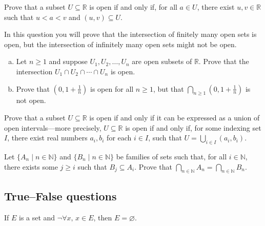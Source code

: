 \begin{chapex}
Prove that a subset $U \subseteq \mathbb{R}$ is open if and only if, for all $a \in U$, there exist $u,v \in \mathbb{R}$ such that $u<a<v$ and $(u,v) \subseteq U$.
\end{chapex}

\begin{chapex}
In this question you will prove that the intersection of finitely many open sets is open, but the intersection of infinitely many open sets might not be open.
\begin{enumerate}[(a)]
\item Let $n \ge 1$ and suppose $U_1, U_2, \dots, U_n$ are open subsets of $\mathbb{R}$. Prove that the intersection $U_1 \cap U_2 \cap \cdots \cap U_n$ is open.
\item Prove that $(0,1+\frac{1}{n})$ is open for all $n \ge 1$, but that $\bigcap_{n \ge 1} (0,1+\textstyle\frac{1}{n})$ is not open.
\end{enumerate}
\end{chapex}

\begin{chapex}
\label{cqOpenSubsetsOfREnd}
Prove that a subset $U \subseteq \mathbb{R}$ is open if and only if it can be expressed as a union of open intervals---more precisely, $U \subseteq \mathbb{R}$ is open if and only if, for some indexing set $I$, there exist real numbers $a_i, b_i$ for each $i \in I$, such that $U = \bigcup_{i \in I} (a_i, b_i)$.
\end{chapex}

\begin{chapex}
Let $\{ A_n \mid n \in \mathbb{N} \}$ and $\{ B_n \mid n \in \mathbb{N} \}$ be families of sets such that, for all $i \in \mathbb{N}$, there exists some $j \ge i$ such that $B_j \subseteq A_i$. Prove that $\bigcap_{n \in \mathbb{N}} A_n = \bigcap_{n \in \mathbb{N}} B_n$.
\end{chapex}

\subsection*{True--False questions}


\begin{chapex}
\label{cqSetsTFBegin}
If $E$ is a set and $\neg \forall x,\, x \in E$, then $E = \varnothing$.
\end{chapex}

